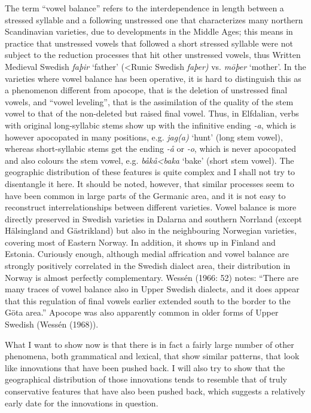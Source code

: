 \begin{styleBodytextC}
The term “vowel balance” refers to the interdependence in length between a stressed syllable and a following unstressed one that characterizes many northern Scandinavian varieties, due to developments in the Middle Ages; this means in practice that unstressed vowels that followed a short stressed syllable were not subject to the reduction processes that hit other unstressed vowels, thus Written Medieval Swedish \textit{faþir }‘father’\textit{ }({\textless}Runic Swedish\textit{ faþer)} vs. \textit{m\=oþer} ‘mother’.  In the varieties where vowel balance has been operative, it is hard to distinguish this as a phenomenon different from apocope, that is the deletion of unstressed final vowels, and “vowel leveling”, that is the assimilation of the quality of the stem vowel to that of the non-deleted but raised final vowel. Thus, in Elfdalian, verbs with original long-syllabic stems show up with the infinitive ending\textit{ -a}, which is however apocopated in many positions, e.g. \textit{jag(a)} ‘hunt’ (long stem vowel), whereas short-syllabic stems get the ending\textit{ -å} or\textit{ -o}, which is never apocopated and also colours the stem vowel, e.g. \textit{båkå{\textless}baka} ‘bake’ (short stem vowel). The geographic distribution of these features is quite complex and I shall not try to disentangle it here. It should be noted, however, that similar processes seem to have been common in large parts of the Germanic area, and it is not easy to reconstruct interrelationships between different varieties. Vowel balance is more directly preserved in Swedish varieties in Dalarna and southern Norrland (except Hälsingland and Gästrikland) but also in the neighbouring Norwegian varieties, covering most of Eastern Norway. In addition, it shows up in Finland and Estonia. Curiously enough, although medial affrication and vowel balance are strongly positively correlated in the Swedish dialect area, their distribution in Norway is almost perfectly complementary. Wessén (1966: 52) notes: “There are many traces of vowel balance also in Upper Swedish dialects, and it does appear that this regulation of final vowels earlier extended south to the border to the Göta area.” Apocope was also apparently common in older forms of Upper Swedish (Wessén (1968)).

\end{styleBodytextC}

\begin{styleBodytextC}
What I want to show now is that there is in fact a fairly large number of other phenomena, both grammatical and lexical, that show similar patterns, that look like innovations that have been pushed back. I will also try to show that the geographical distribution of those innovations tends to resemble that of truly conservative features that have also been pushed back, which suggests a relatively early date for the innovations in question.

\end{styleBodytextC}

